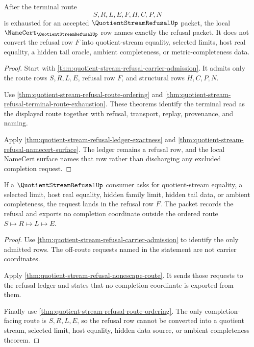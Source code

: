 \begin{theorem}
\label{thm:quotient-stream-refusal-terminal-route-naming-exactness}
After the terminal route
$$
S,R,L,E,F,H,C,P,N
$$
is exhausted for an accepted $\QuotientStreamRefusalUp$ packet, the local $\NameCert_{\QuotientStreamRefusalUp}$ row names exactly the refusal packet. It does not convert the refusal row $F$ into quotient-stream equality, selected limits, host real equality, a hidden tail oracle, ambient completeness, or metric-completeness data.
\end{theorem}
\begin{proof}
Start with \autoref{thm:quotient-stream-refusal-carrier-admission}. It admits only the route rows $S,R,L,E$, refusal row $F$, and structural rows $H,C,P,N$.

Use \autoref{thm:quotient-stream-refusal-route-ordering} and \autoref{thm:quotient-stream-refusal-terminal-route-exhaustion}. These theorems identify the terminal read as the displayed route together with refusal, transport, replay, provenance, and naming.

Apply \autoref{thm:quotient-stream-refusal-ledger-exactness} and \autoref{thm:quotient-stream-refusal-namecert-surface}. The ledger remains a refusal row, and the local NameCert surface names that row rather than discharging any excluded completion request.
\end{proof}

\begin{theorem}
\label{thm:quotient-stream-refusal-offroute-nonescape}
If a $\QuotientStreamRefusalUp$ consumer asks for quotient-stream equality, a selected limit, host real equality, hidden family limit, hidden tail data, or ambient completeness, the request lands in the refusal row $F$. The packet records the refusal and exports no completion coordinate outside the ordered route $S \longmapsto R \longmapsto L \longmapsto E$.
\end{theorem}
\begin{proof}
Use \autoref{thm:quotient-stream-refusal-carrier-admission} to identify the only admitted rows. The off-route requests named in the statement are not carrier coordinates.

Apply \autoref{thm:quotient-stream-refusal-nonescape-route}. It sends those requests to the refusal ledger and states that no completion coordinate is exported from them.

Finally use \autoref{thm:quotient-stream-refusal-route-ordering}. The only completion-facing route is $S,R,L,E$, so the refusal row cannot be converted into a quotient stream, selected limit, host equality, hidden data source, or ambient completeness theorem.
\end{proof}


